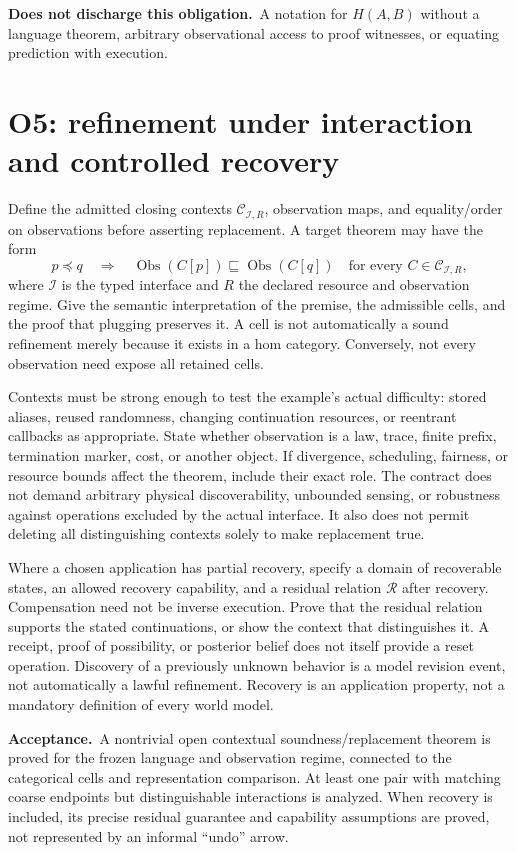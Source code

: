 \documentclass[11pt,a4paper]{article}
\newcommand{\Obs}{\operatorname{Obs}}
\newcommand{\accept}{\par\textbf{Acceptance.}\ }
\newcommand{\notaccepted}{\par\textbf{Does not discharge this obligation.}\ }
\begin{document}
\notaccepted A notation for \(H(A,B)\) without a language theorem, arbitrary
observational access to proof witnesses, or equating prediction with execution.

\section{O5: refinement under interaction and controlled recovery}\label{sec:o5}

Define the admitted closing contexts \(\mathcal C_{\mathcal I,R}\), observation
maps, and equality/order on observations before asserting replacement.
A target theorem may have the form
\[
 p\preceq q\quad\Longrightarrow\quad
 \Obs(C[p])\sqsubseteq\Obs(C[q])
 \quad\text{for every }C\in\mathcal C_{\mathcal I,R},
\]
where \(\mathcal I\) is the typed interface and \(R\) the declared resource
and observation regime. Give the semantic interpretation of the premise,
the admissible cells, and the proof that plugging preserves it. A cell is
not automatically a sound refinement merely because it exists in a hom
category. Conversely, not every observation need expose all retained cells.

Contexts must be strong enough to test the example's actual difficulty:
stored aliases, reused randomness, changing continuation resources, or
reentrant callbacks as appropriate. State whether observation is a law,
trace, finite prefix, termination marker, cost, or another object. If
divergence, scheduling, fairness, or resource bounds affect the theorem,
include their exact role. The contract does not demand arbitrary physical
discoverability, unbounded sensing, or robustness against operations excluded
by the actual interface. It also does not permit deleting all distinguishing
contexts solely to make replacement true.

Where a chosen application has partial recovery, specify a domain of
recoverable states, an allowed recovery capability, and a residual relation
\(\mathcal R\) after recovery. Compensation need not be inverse execution.
Prove that the residual relation supports the stated continuations, or show
the context that distinguishes it. A receipt, proof of possibility, or
posterior belief does not itself provide a reset operation. Discovery of a
previously unknown behavior is a model revision event, not automatically a
lawful refinement. Recovery is an application property, not a mandatory
definition of every world model.

\accept A nontrivial open contextual soundness/replacement theorem is proved
for the frozen language and observation regime, connected to the categorical
cells and representation comparison. At least one pair with matching coarse
endpoints but distinguishable interactions is analyzed. When recovery is
included, its precise residual guarantee and capability assumptions are
proved, not represented by an informal ``undo'' arrow.
\end{document}
